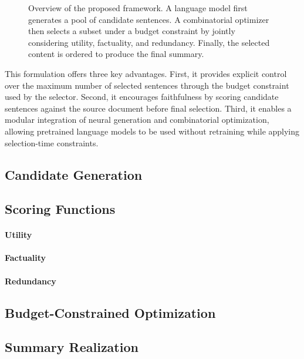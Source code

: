 \documentclass[11pt]{article}
\begin{document}
\begin{figure}[t]
\centering
{}
\caption{Overview of the proposed framework. A language model first generates a pool of candidate sentences. A combinatorial optimizer then selects a subset under a budget constraint by jointly considering utility, factuality, and redundancy. Finally, the selected content is ordered to produce the final summary.}
\label{fig:pipeline}
\end{figure}

This formulation offers three key advantages. First, it provides explicit control over the maximum number of selected sentences through the budget constraint used by the selector. Second, it encourages faithfulness by scoring candidate sentences against the source document before final selection. Third, it enables a modular integration of neural generation and combinatorial optimization, allowing pretrained language models to be used without retraining while applying selection-time constraints.




\subsection{Candidate Generation}
\subsection{Scoring Functions}
\paragraph{Utility}
\paragraph{Factuality}
\paragraph{Redundancy}
\subsection{Budget-Constrained Optimization}
\subsection{Summary Realization}
\end{document}
